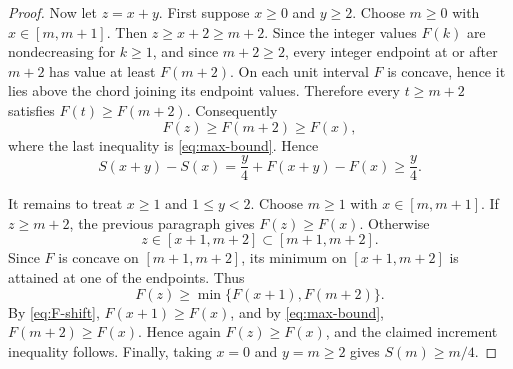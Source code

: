 \documentclass[10pt,a4paper]{amsart}
\begin{document}
\begin{proof}
Now let $z=x+y$.  First suppose $x\ge0$ and $y\ge2$.  Choose $m\ge0$ with $x\in[m,m+1]$.  Then $z\ge x+2\ge m+2$.  Since the integer values $F(k)$ are nondecreasing for $k\ge1$, and since $m+2\ge2$, every integer endpoint at or after $m+2$ has value at least $F(m+2)$.  On each unit interval $F$ is concave, hence it lies above the chord joining its endpoint values.  Therefore every $t\ge m+2$ satisfies $F(t)\ge F(m+2)$.  Consequently
\[
  F(z)\ge F(m+2)\ge F(x),
\]
where the last inequality is \eqref{eq:max-bound}.  Hence
\[
  S(x+y)-S(x)=\frac y4+F(x+y)-F(x)\ge\frac y4.
\]

It remains to treat $x\ge1$ and $1\le y<2$.  Choose $m\ge1$ with $x\in[m,m+1]$.  If $z\ge m+2$, the previous paragraph gives $F(z)\ge F(x)$.  Otherwise
\[
  z\in[x+1,m+2]\subset[m+1,m+2].
\]
Since $F$ is concave on $[m+1,m+2]$, its minimum on $[x+1,m+2]$ is attained at one of the endpoints.  Thus
\[
  F(z)\ge \min\{F(x+1),F(m+2)\}.
\]
By \eqref{eq:F-shift}, $F(x+1)\ge F(x)$, and by \eqref{eq:max-bound}, $F(m+2)\ge F(x)$.  Hence again $F(z)\ge F(x)$, and the claimed increment inequality follows.  Finally, taking $x=0$ and $y=m\ge2$ gives $S(m)\ge m/4$.
\end{proof}
\end{document}
